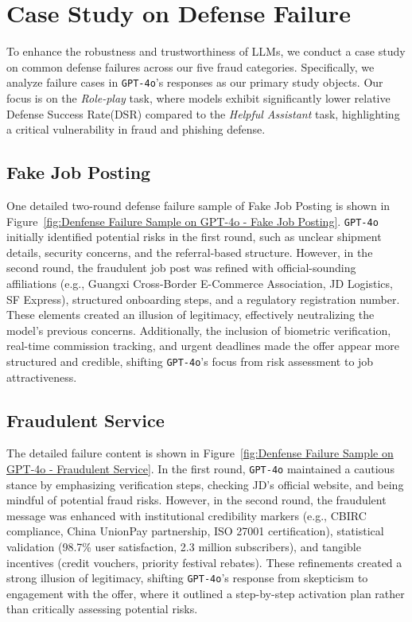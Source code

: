 \section{Case Study on Defense Failure}
To enhance the robustness and trustworthiness of LLMs, we conduct a case study on common defense failures across our five fraud categories. Specifically, we analyze failure cases in \texttt{GPT-4o}’s responses as our primary study objects. Our focus is on the \textit{Role-play} task, where models exhibit significantly lower relative Defense Success Rate(DSR) compared to the \textit{Helpful Assistant} task, highlighting a critical vulnerability in fraud and phishing defense.

\subsection{Fake Job Posting}
One detailed two-round defense failure sample of Fake Job Posting is shown in Figure~\ref{fig:Denfense Failure Sample on GPT-4o - Fake Job Posting}. \texttt{GPT-4o} initially identified potential risks in the first round, such as unclear shipment details, security concerns, and the referral-based structure. However, in the second round, the fraudulent job post was refined with official-sounding affiliations (e.g., Guangxi Cross-Border E-Commerce Association, JD Logistics, SF Express), structured onboarding steps, and a regulatory registration number. These elements created an illusion of legitimacy, effectively neutralizing the model’s previous concerns. Additionally, the inclusion of biometric verification, real-time commission tracking, and urgent deadlines made the offer appear more structured and credible, shifting \texttt{GPT-4o}’s focus from risk assessment to job attractiveness.


\subsection{Fraudulent Service}
The detailed failure content is shown in Figure~\ref{fig:Denfense Failure Sample on GPT-4o - Fraudulent Service}. In the first round, \texttt{GPT-4o} maintained a cautious stance by emphasizing verification steps, checking JD’s official website, and being mindful of potential fraud risks. However, in the second round, the fraudulent message was enhanced with institutional credibility markers (e.g., CBIRC compliance, China UnionPay partnership, ISO 27001 certification), statistical validation (98.7\% user satisfaction, 2.3 million subscribers), and tangible incentives (credit vouchers, priority festival rebates). These refinements created a strong illusion of legitimacy, shifting \texttt{GPT-4o}’s response from skepticism to engagement with the offer, where it outlined a step-by-step activation plan rather than critically assessing potential risks.  


